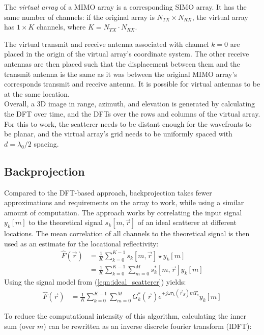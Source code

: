 The \textit{virtual array} of a MIMO array is a corresponding SIMO array.
It has the same number of channels:
if the original array is $N_{TX} \times N_{RX}$, the virtual array has $1 \times K$ channels, where $K=N_{TX} \cdot N_{RX}$.

The virtual transmit and receive antenna associated with channel $k=0$ are placed in the origin of the virtual array's coordinate system.
The other receive antennas are then placed such that the displacement between them and the transmit antenna
is the same as it was between the original MIMO array's corresponds transmit and receive antenna.
It is possible for virtual antennas to be at the same location.
\\

Overall, a 3D image in range, azimuth, and elevation is generated
by calculating the DFT over time, and the DFTs over the rows and columns of the virtual array.
For this to work, the scatterer needs to be distant enough for the wavefronts to be planar,
and the virtual array's grid needs to be uniformly spaced with $d=\lambda_0/2$ spacing.

\subsection{Backprojection}
\label{ssec:bp_imaging_theory}
Compared to the DFT-based approach, backprojection takes fewer approximations and requirements on the array to work,
while using a similar amount of computation.
The approach works by correlating the input signal $y_k[m]$
to the theoretical signal $s_k[m, \vec r]$ of an ideal scatterer at different locations.
The mean correlation of all channels to the theoretical signal is then used as an estimate for the locational reflectivity:
\begin{align}
    \hat F(\vec r) & = \frac{1}{K} \sum_{k=0}^{K-1} s_k[m, \vec r] \star y_k[m]             \\
                   & = \frac{1}{K}\sum_{k=0}^{K-1}\sum_{m=0}^{M} s_k^\ast[m, \vec r] y_k[m]
\end{align}
Using the signal model from (\ref*{eqn:ideal_scatterer}) yields:
\begin{align}
    \hat F(\vec r) & = \frac{1}{K}\sum_{k=0}^{K-1}\sum_{m=0}^{M}
    G_k^\ast(\vec r)e^{+j\dot\omega\tau_k(\vec r_S)mT_s} y_k[m]
\end{align}

To reduce the computational intensity of this algorithm,
calculating the inner sum (over $m$) can be rewritten as an inverse discrete fourier transform (IDFT):

